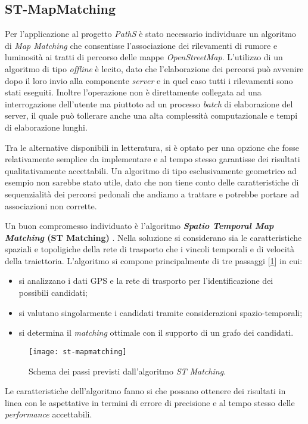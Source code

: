 \subsection{ST-MapMatching}
Per l'applicazione al progetto \emph{PathS} è stato necessario individuare un algoritmo di \emph{Map Matching} che consentisse l'associazione dei rilevamenti di rumore e luminosità ai tratti di percorso delle mappe \emph{OpenStreetMap}. L'utilizzo di un algoritmo di tipo \emph{offline} è lecito, dato che l'elaborazione dei percorsi può avvenire dopo il loro invio alla componente \emph{server} e in quel caso tutti i rilevamenti sono stati eseguiti. Inoltre l'operazione non è direttamente collegata ad una interrogazione dell'utente ma piuttoto ad un processo \emph{batch} di elaborazione del server, il quale può tollerare anche una alta complessità computazionale e tempi di elaborazione lunghi.

Tra le alternative disponibili in letteratura, si è optato per una opzione che fosse relativamente semplice da implementare e al tempo stesso garantisse dei risultati qualitativamente accettabili. Un algoritmo di tipo esclusivamente geometrico ad esempio non sarebbe stato utile, dato che non tiene conto delle caratteristiche di sequenzialità dei percorsi pedonali che andiamo a trattare e potrebbe portare ad associazioni non corrette.

Un buon compromesso individuato è l'algoritmo \textbf{\emph{Spatio Temporal Map Matching} (ST Matching)} \cite{stmapmatching}. Nella soluzione si considerano sia le caratteristiche spaziali e topoligiche della rete di trasporto che i vincoli temporali e di velocità della traiettoria. L'algoritmo si compone principalmente di tre passaggi [\ref{fig:st-mapmatching}] in cui:
\begin{itemize}
	\item si analizzano i dati GPS e la rete di trasporto per l'identificazione dei possibili candidati;
	\item si valutano singolarmente i candidati tramite considerazioni spazio-temporali;
	\item si determina il \emph{matching} ottimale con il supporto di un grafo dei candidati.
\end{itemize}
\begin{figure}[h]
  \centering
  \texttt{[image: st-mapmatching]}
  \caption{\footnotesize{Schema dei passi previsti dall'algoritmo \emph{ST Matching}.}}
  \label{fig:st-mapmatching}
\end{figure}
Le caratteristiche dell'algoritmo fanno si che possano ottenere dei risultati in linea con le aspettative in termini di errore di precisione e al tempo stesso delle \emph{performance} accettabili. 

